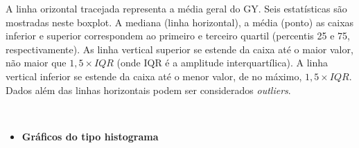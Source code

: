 \documentclass[
]{book}
\newenvironment{Shaded}{\begin{snugshade}}{\end{snugshade}}
\newcommand{\DataTypeTok}[1]{\textcolor[rgb]{0.13,0.29,0.53}{#1}}
\newcommand{\DecValTok}[1]{\textcolor[rgb]{0.00,0.00,0.81}{#1}}
\newcommand{\FloatTok}[1]{\textcolor[rgb]{0.00,0.00,0.81}{#1}}
\newcommand{\KeywordTok}[1]{\textcolor[rgb]{0.13,0.29,0.53}{\textbf{#1}}}
\newcommand{\NormalTok}[1]{#1}
\newcommand{\OperatorTok}[1]{\textcolor[rgb]{0.81,0.36,0.00}{\textbf{#1}}}
\newcommand{\StringTok}[1]{\textcolor[rgb]{0.31,0.60,0.02}{#1}}
\providecommand{\tightlist}{%
  \setlength{\itemsep}{0pt}\setlength{\parskip}{0pt}}
\begin{document}

A linha orizontal tracejada representa a média geral do GY. Seis estatísticas são mostradas neste boxplot. A mediana (linha horizontal), a média (ponto) as caixas inferior e superior correspondem ao primeiro e terceiro quartil (percentis 25 e 75, respectivamente). As linha vertical superior se estende da caixa até o maior valor, não maior que \(1,5 \times {IQR}\) (onde IQR é a amplitude interquartílica). A linha vertical inferior se estende da caixa até o menor valor, de no máximo, \(1,5 \times {IQR}\). Dados além das linhas horizontais podem ser considerados \emph{outliers}.

\(~\)

\begin{itemize}
\tightlist
\item
  \textbf{Gráficos do tipo histograma}
\end{itemize}

\begin{Shaded}
\end{Shaded}
\end{document}
